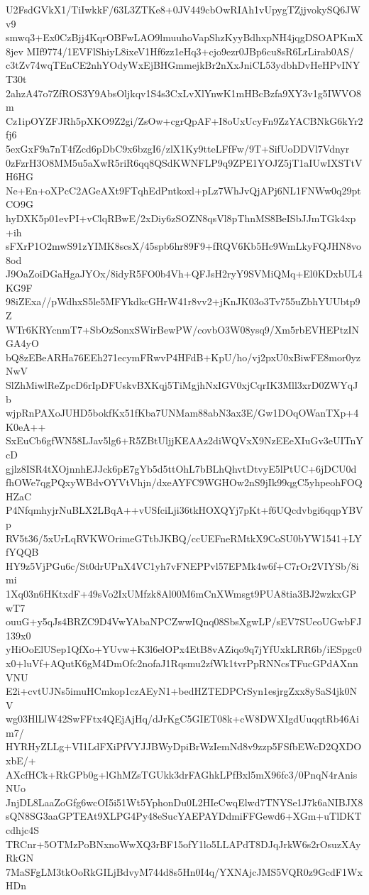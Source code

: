 U2FsdGVkX1/TiIwkkF/63L3ZTKe8+0JV449cbOwRIAh1vUpygTZjjvokySQ6JWv9
smwq3+Ex0CzBjj4KqrOBFwLAO9lmuuhoVapShzKyyBdhxpNH4jqgDSOAPKmX8jev
MIf9774/1EVFlShiyL8ixeV1Hf6zz1eHq3+cjo9ezr0JBp6cu8sR6LrLirab0AS/
c3tZv74wqTEnCE2nhYOdyWxEjBHGmmejkBr2nXxJniCL53ydbhDvHeHPvINYT30t
2ahzA47o7ZfROS3Y9AbsOljkqv1S4s3CxLvXlYnwK1mHBcBzfa9XY3v1g5IWVO8m
Cz1ipOYZFJRh5pXKO9Z2gi/ZsOw+cgrQpAF+I8oUxUcyFn9ZzYACBNkG6kYr2fj6
5exGxF9a7nT4fZcd6pDbC9x6bzgI6/zlX1Ky9tteLFfFw/9T+SifUoDDVl7Vdnyr
0zFzrH3O8MM5u5aXwR5riR6qq8QSdKWNFLP9q9ZPE1YOJZ5jT1aIUwIXSTtVH6HG
Ne+En+oXPcC2AGeAXt9FTqhEdPntkoxl+pLz7WhJvQjAPj6NL1FNWw0q29ptCO9G
hyDXK5p01evPI+vClqRBwE/2xDiy6zSOZN8qsVl8pThnMS8BeISbJJmTGk4xp+ih
sFXrP1O2mwS91zYIMK8scsX/45spb6hr89F9+fRQV6Kb5Hc9WmLkyFQJHN8vo8od
J9OaZoiDGaHgaJYOx/8idyR5FO0b4Vh+QFJsH2ryY9SVMiQMq+El0KDxbUL4KG9F
98iZExa//pWdhxS5le5MFYkdkcGHrW41r8vv2+jKnJK03o3Tv755uZbhYUUbtp9Z
WTr6KRYcnmT7+SbOzSonxSWirBewPW/covbO3W08ysq9/Xm5rbEVHEPtzINGA4yO
bQ8zEBeARHa76EEh271ecymFRwvP4HFdB+KpU/ho/vj2pxU0xBiwFE8mor0yzNwV
SlZhMiwlReZpcD6rIpDFUskvBXKqj5TiMgjhNxIGV0xjCqrIK3Mll3xrD0ZWYqJb
wjpRnPAXoJUHD5bokfKx51fKba7UNMam88abN3ax3E/Gw1DOqOWanTXp+4K0eA++
SxEuCb6gfWN58LJav5lg6+R5ZBtUljjKEAAz2diWQVxX9NzEEeXIuGv3eUITnYcD
gjlz8ISR4tXOjnnhEJJck6pE7gYb5d5ttOhL7bBLhQhvtDtvyE5lPtUC+6jDCU0d
fhOWe7qgPQxyWBdvOYVtVhjn/dxeAYFC9WGHOw2nS9jIk99qgC5yhpeohFOQHZaC
P4NfqmhyjrNuBLX2LBqA++vUSfciLji36tkHOXQYj7pKt+f6UQcdvbgi6qqpYBVp
RV5t36/5xUrLqRVKWOrimeGTtbJKBQ/ccUEFneRMtkX9CoSU0bYW1541+LYfYQQB
HY9z5VjPGu6c/St0drUPnX4VC1yh7vFNEPPvl57EPMk4w6f+C7rOr2VIYSb/8imi
1Xq03n6HKtxdF+49sVo2IxUMfzk8Al00M6mCnXWmsgt9PUA8tia3BJ2wzkxGPwT7
ouuG+y5qJs4BRZC9D4VwYAbaNPCZwwIQnq08SbsXgwLP/sEV7SUeoUGwbFJ139x0
yHiOoElUSep1QfXo+YUvw+K3l6elOPx4EtB8vAZiqo9q7jYfUxkLRR6b/iESpgc0
x0+luVf+AQutK6gM4DmOfc2nofaJ1Rqsmu2zfWk1tvrPpRNNcsTFucGPdAXnnVNU
E2i+cvtUJNs5imuHCmkop1czAEyN1+bedHZTEDPCrSyn1esjrgZxx8ySaS4jk0NV
wg03HlLlW42SwFFtx4QEjAjHq/dJrKgC5GIET08k+cW8DWXIgdUuqqtRb46Aim7/
HYRHyZLLg+VI1LdFXiPfVYJJBWyDpiBrWzIemNd8v9zzp5FSfbEWcD2QXDOxbE/+
AXcfHCk+RkGPb0g+lGhMZsTGUkk3drFAGhkLPfBxl5mX96fc3/0PnqN4rAnisNUo
JnjDL8LaaZoGfg6wcOI5i51Wt5YphonDu0L2HIeCwqElwd7TNYSe1J7k6aNIBJX8
sQN8SG3aaGPTEAt9XLPG4Py48eSucYAEPAYDdmiFFGewd6+XGm+uTlDKTcdhjc4S
TRCnr+5OTMzPoBNxnoWwXQ3rBF15ofY1lo5LLAPdT8DJqJrkW6s2rOsuzXAyRkGN
7MaSFgLM3tkOoRkGILjBdvyM744d8s5Hn0I4q/YXNAjcJMS5VQR0z9GcdF1WxHDn
